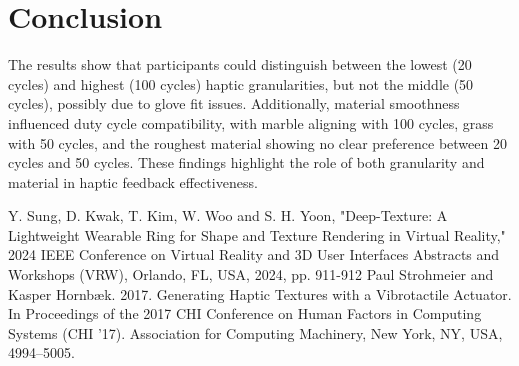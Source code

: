 \documentclass[a4paper,twocolumn]{article}
\begin{document}
\section{Conclusion}
The results show that participants could distinguish between the lowest (20 cycles) and highest (100 cycles) haptic granularities, but not the middle (50 cycles), possibly due to glove fit issues. Additionally, material smoothness influenced duty cycle compatibility, with marble aligning with 100 cycles, grass with 50 cycles, and the roughest material showing no clear preference between 20 cycles and 50 cycles. These findings highlight the role of both granularity and material in haptic feedback effectiveness.
\begin{thebibliography}{99}
  \tiny
     Y. Sung, D. Kwak, T. Kim, W. Woo and S. H. Yoon, "Deep-Texture: A Lightweight Wearable Ring for Shape and Texture Rendering in Virtual Reality," 2024 IEEE Conference on Virtual Reality and 3D User Interfaces Abstracts and Workshops (VRW), Orlando, FL, USA, 2024, pp. 911-912
     Paul Strohmeier and Kasper Hornbæk. 2017. Generating Haptic Textures with a Vibrotactile Actuator. In Proceedings of the 2017 CHI Conference on Human Factors in Computing Systems (CHI '17). Association for Computing Machinery, New York, NY, USA, 4994–5005.
\end{thebibliography}
\end{document}
